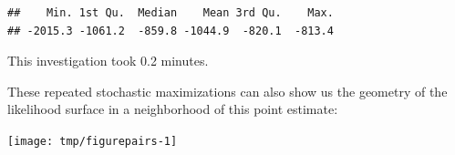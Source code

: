 \begin{frame}[fragile]

\begin{knitrout}\small
{}\color{fgcolor}\begin{kframe}
\begin{alltt}
 \hlkwb{<-} \hlstd{(}\hlstd{=lik_m2[,}\hlstd{],}\hlstd{=lik_m2[,}\hlstd{],}
  \hlstd{(}
 \hlkwb{<-} \hlstd{(}\hlstd{,}
  \hlstd{=}\hlstd{,}
\hlstd{(}
  \hlstd{=}\hlstd{,}\hlstd{=}\hlstd{)}
\hlopt{$}\hlstd{=}\hlstd{)}
\end{alltt}
\begin{verbatim}
##    Min. 1st Qu.  Median    Mean 3rd Qu.    Max. 
## -2015.3 -1061.2  -859.8 -1044.9  -820.1  -813.4
\end{verbatim}
\end{kframe}
\end{knitrout}

\bi

\item This investigation took  0.2 minutes.
\item
These repeated stochastic maximizations can also show us the geometry of the likelihood surface in a neighborhood of this point estimate:

\ei

\end{frame}

\begin{frame}[fragile]
\begin{knitrout}\small
{}\color{fgcolor}\begin{kframe}
\begin{alltt}
\hlstd{(}\hlopt{~}\hlopt{+}\hlopt{+}\hlopt{+}\hlopt{+}\hlopt{+}
  \hlstd{=}\hlopt{>}\hlopt{-}\hlstd{))}
\end{alltt}
\end{kframe}

{\centering \texttt{[image: tmp/figurepairs-1]} 

}



\end{knitrout}

\end{frame}

